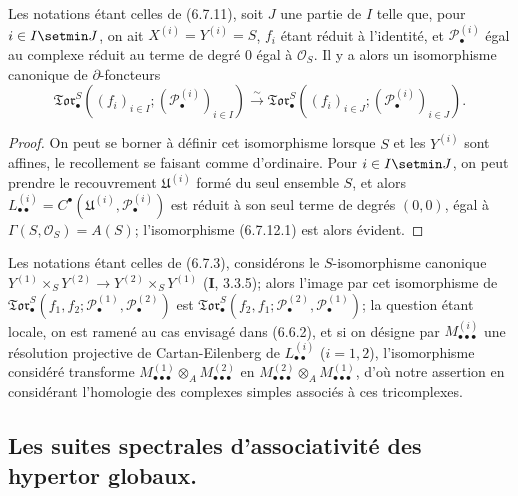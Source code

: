 \begin{proposition}[6.7.12]
Les notations étant celles de (6.7.11), soit $J$ une partie de $I$ telle que,
pour $i\in I\setmin J$, on ait $X^{(i)}=Y^{(i)}=S$, $f_i$ étant réduit à l'identité,
et $\mathscr P_\bullet^{(i)}$ égal au complexe réduit au terme de degré $0$
égal à $\mathscr O_S$. Il y a alors un isomorphisme canonique de
$\partial$-foncteurs
\[
  \mathfrak{Tor}_\bullet^S
  ((f_i)_{i\in I};(\mathscr P_\bullet^{(i)})_{i\in I})
  \xrightarrow{\sim}
  \mathfrak{Tor}_\bullet^S
  ((f_i)_{i\in J};(\mathscr P_\bullet^{(i)})_{i\in J}).
  \tag{6.7.12.1}\label{III.6.7.12.1.fr}
\]
\end{proposition}

\begin{proof}
On peut se borner à définir cet isomorphisme lorsque $S$ et les $Y^{(i)}$
sont affines, le recollement se faisant comme d'ordinaire. Pour $i\in I\setmin J$,
on peut prendre le recouvrement $\mathfrak U^{(i)}$ formé du seul ensemble
$S$, et alors
$L_{\bullet\bullet}^{(i)}=C^\bullet(\mathfrak U^{(i)},
\mathscr P_\bullet^{(i)})$ est réduit à son seul terme de degrés $(0,0)$,
égal à $\Gamma(S,\mathscr O_S)=A(S)$; l'isomorphisme (6.7.12.1) est alors
évident.
\end{proof}

\begin{remark}[6.7.13]
Les notations étant celles de (6.7.3), considérons le $S$-isomorphisme
canonique
$Y^{(1)}\times_S Y^{(2)}\to Y^{(2)}\times_S Y^{(1)}$ (\textbf{I}, 3.3.5); alors
l'image par cet isomorphisme de
$\mathfrak{Tor}_\bullet^S(f_1,f_2;
\mathscr P_\bullet^{(1)},\mathscr P_\bullet^{(2)})$ est
$\mathfrak{Tor}_\bullet^S(f_2,f_1;
\mathscr P_\bullet^{(2)},\mathscr P_\bullet^{(1)})$; la question étant
locale, on est ramené au cas envisagé dans (6.6.2), et si on désigne par
$M_{\bullet\bullet\bullet}^{(i)}$ une résolution projective de
Cartan-Eilenberg de $L_{\bullet\bullet}^{(i)}$ ($i=1,2$), l'isomorphisme
considéré transforme
$M_{\bullet\bullet\bullet}^{(1)}\otimes_A
M_{\bullet\bullet\bullet}^{(2)}$ en
$M_{\bullet\bullet\bullet}^{(2)}\otimes_A
M_{\bullet\bullet\bullet}^{(1)}$, d'où notre assertion en considérant
l'homologie des complexes simples associés à ces tricomplexes.
\end{remark}

\subsection{Les suites spectrales d'associativité des hypertor globaux.}


